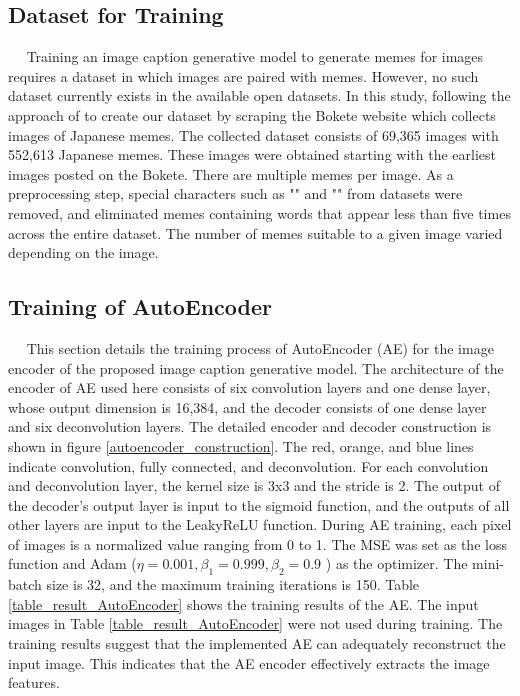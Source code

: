 \documentclass[runningheads]{llncs}
\begin{document}
\subsection{Dataset for Training}
~~ Training an image caption generative model to generate memes for images requires a dataset in which images are paired with memes. However, no such dataset currently exists in the available open datasets. In this study, following the approach of \cite{ref_NJM} to create our dataset by scraping the Bokete \cite{ref_Bokete} website which collects images of Japanese memes. The collected dataset consists of 69,365 images with 552,613 Japanese memes. These images were obtained starting with the earliest images posted on the Bokete. There are multiple memes per image. As a preprocessing step, special characters such as "\text{!}" and "" from datasets were removed, and eliminated memes containing words that appear less than five times across the entire dataset. The number of memes suitable to a given image varied depending on the image.

\subsection{Training of AutoEncoder}
~~ This section details the training process of AutoEncoder (AE) for the image encoder of the proposed image caption generative model. The architecture of the encoder of AE used here consists of six convolution layers and one dense layer, whose output dimension is 16,384, and the decoder consists of one dense layer and six deconvolution layers. The detailed encoder and decoder construction is shown in figure \ref{autoencoder_construction}. The red, orange, and blue lines indicate convolution, fully connected, and deconvolution. For each convolution and deconvolution layer, the kernel size is 3x3 and the stride is 2. The output of the decoder's output layer is input to the sigmoid function, and the outputs of all other layers are input to the LeakyReLU function. During AE training, each pixel of images is a normalized value ranging from 0 to 1. The MSE was set as the loss function and Adam ($ \eta=0.001,\beta_1=0.999,\beta_2=0.9 $ ) \cite{ref_Adam} as the optimizer. The mini-batch size is 32, and the maximum training iterations is 150. Table \ref{table_result_AutoEncoder} shows the training results of the AE. The input images in Table \ref{table_result_AutoEncoder} were not used during training. The training results suggest that the implemented AE can adequately reconstruct the input image. This indicates that the AE encoder effectively extracts the image features.
\end{document}
